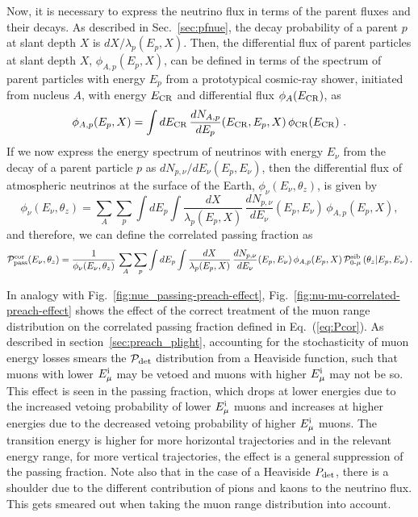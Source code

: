 \documentclass[aps,prd,showpacs,letterpaper,onecolumn,longbibliography,superscriptaddress,notitlepage,nofootinbib]{revtex4-1}%
\newcommand{\Emi}{E_{\mu}^{\rm i}}
\newcommand{\ECR}{E_{\rm CR}}
\newcommand{\Prob}{{\cal P}}
\newcommand{\Ppcor}{\Prob_{\rm pass}^{\rm cor}}
\newcommand{\Pzmsib}{\Prob_{0\text{-}\mu}^{\rm sib}}
\begin{document}
Now, it is necessary to express the neutrino flux in terms of the parent fluxes and their decays. As described in Sec.~\ref{sec:pfnue}, the decay probability of a parent $p$ at slant depth $X$ is $dX/\lambda_p(E_p, X)$. Then, the differential flux of parent particles at slant depth $X$, $\phi_{A, p}(E_p, X)$, can be defined in terms of the spectrum of parent particles with energy $E_p$ from a prototypical cosmic-ray shower, initiated from nucleus $A$, with energy $\ECR$ and differential flux $\phi_{A}(\ECR)$, as
%
\begin{equation}
\label{eq:phip}
\phi_{A, p}(E_p, X) = \int d\ECR \, \frac{dN_{A, p}}{dE_p}(\ECR, E_p, X) \, \phi_{\rm CR} (\ECR) ~.
\end{equation}
%
If we now express the energy spectrum of neutrinos with energy $E_\nu$ from the decay of a parent particle $p$ as $dN_{p, \nu}/dE_\nu(E_p,E_\nu)$, then the differential flux of atmospheric neutrinos at the surface of the Earth, $\phi_\nu(E_\nu, \theta_z)$, is given by
%
\begin{equation}
\label{eq:nufluxcor}
\phi_\nu(E_\nu, \theta_z) = \sum_A \sum_{p} \int dE_p  \int \frac{dX}{\lambda_p(E_p, X)} \, \frac{dN_{p, \nu}}{dE_\nu}(E_p, E_\nu) \, \phi_{A, p}(E_p, X),
\end{equation}
%
and therefore, we can define the correlated passing fraction as
%
\begin{equation}
\label{eq:Pcor}
\Ppcor(E_\nu, \theta_z) = \frac{1}{\phi_\nu(E_\nu, \theta_z)} \, \sum_A \sum_{p} \int dE_p \int \frac{dX}{\lambda_p(E_p, X)} \, \frac{dN_{p, \nu}}{dE_\nu}(E_p, E_\nu) \, \phi_{A, p}(E_p, X) \, \Pzmsib \left(\theta_z|E_p, E_\nu \right).
\end{equation}
%

In analogy with Fig.~\ref{fig:nue_passing-preach-effect}, Fig.~\ref{fig:nu-mu-correlated-preach-effect} shows the effect of the correct treatment of the muon range distribution on the correlated passing fraction defined in Eq.~(\ref{eq:Pcor}). As described in section~\ref{sec:preach_plight}, accounting for the stochasticity of muon energy losses smears the $\Prob_{\rm det}$ distribution from a Heaviside function, such that muons with lower $\Emi$ may be vetoed and muons with higher $\Emi$ may not be so. This effect is seen in the passing fraction, which drops at lower energies due to the increased vetoing probability of lower $\Emi$ muons and increases at higher energies due to the decreased vetoing probability of higher $\Emi$ muons. The transition energy is higher for more horizontal trajectories and in the relevant energy range, for more vertical trajectories, the effect is a general suppression of the passing fraction. Note also that in the case of a Heaviside $P_{\rm det}$, there is a shoulder due to the different contribution of pions and kaons to the neutrino flux. This gets smeared out when taking the muon range distribution into account.
\end{document}
